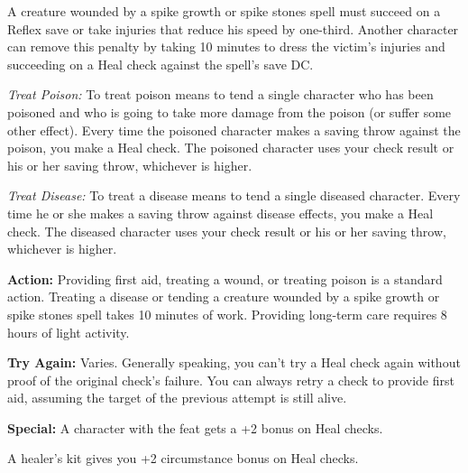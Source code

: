 A creature wounded by a spike growth or spike stones spell must succeed on a Reflex save or take injuries that reduce his speed by one-third. Another character can remove this penalty by taking 10 minutes to dress the victim's injuries and succeeding on a Heal check against the spell's save DC.

\textit{Treat Poison:} To treat poison means to tend a single character who has been poisoned and who is going to take more damage from the poison (or suffer some other effect). Every time the poisoned character makes a saving throw against the poison, you make a Heal check. The poisoned character uses your check result or his or her saving throw, whichever is higher.

\textit{Treat Disease:} To treat a disease means to tend a single diseased character. Every time he or she makes a saving throw against disease effects, you make a Heal check. The diseased character uses your check result or his or her saving throw, whichever is higher.

\textbf{Action:} Providing first aid, treating a wound, or treating poison is a standard action. Treating a disease or tending a creature wounded by a spike growth or spike stones spell takes 10 minutes of work. Providing long-term care requires 8 hours of light activity.

\textbf{Try Again:} Varies. Generally speaking, you can't try a Heal check again without proof of the original check's failure. You can always retry a check to provide first aid, assuming the target of the previous attempt is still alive.

\textbf{Special:} A character with the  feat gets a +2 bonus on Heal checks.

A healer's kit gives you +2 circumstance bonus on Heal checks.